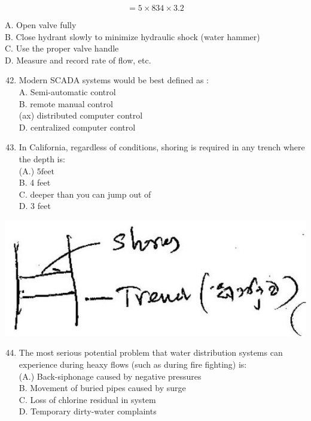 \documentclass[10pt]{article}
\begin{document}
$$
=5 \times 834 \times 3.2
$$

A. Open valve fully\\
B. Close hydrant slowly to minimize hydraulic shock (water hammer)\\
C. Use the proper valve handle\\
D. Measure and record rate of flow, etc.

\begin{enumerate}
  \setcounter{enumi}{41}
  \item Modern SCADA systems would be best defined as :\\
A. Semi-automatic control\\
B. remote manual control\\
(ax) distributed computer control\\
D. centralized computer control

  \item In California, regardless of conditions, shoring is required in any trench where the depth is:\\
(A.) $5 \mathrm{feet}$\\
B. 4 feet\\
C. deeper than you can jump out of\\
D. 3 feet

\end{enumerate}

\includegraphics[max width=\textwidth]{2022_11_11_a5e8a54031fc138b833ag-6(1)}

\begin{enumerate}
  \setcounter{enumi}{43}
  \item The most serious potential problem that water distribution systems can experience during heaxy flows (such as during fire fighting) is:\\
(A.) Back-siphonage caused by negative pressures\\
B. Movement of buried pipes caused by surge\\
C. Loss of chlorine residual in system\\
D. Temporary dirty-water complaints
\end{enumerate}
\end{document}
